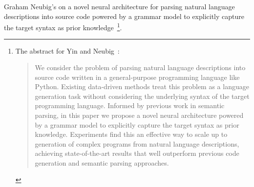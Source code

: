 Graham Neubig's {} on a novel neural architecture for parsing natural language descriptions into source code powered by a grammar model to explicitly capture the target syntax as prior knowledge~\cite{YinandNeubigACL-17}\footnote{%
%
  The abstract for Yin and Neubig~\cite{YinandNeubigACL-17}:
%
  \begin{quotation}
%
    We consider the problem of parsing natural language descriptions into source code written in a general-purpose programming language like Python. Existing data-driven methods treat this problem as a language generation task without considering the underlying syntax of the target programming language. Informed by previous work in semantic parsing, in this paper we propose a novel neural architecture powered by a grammar model to explicitly capture the target syntax as prior knowledge. Experiments find this an effective way to scale up to generation of complex programs from natural language descriptions, achieving state-of-the-art results that well outperform previous code generation and semantic parsing approaches.
%
  \end{quotation}}.

